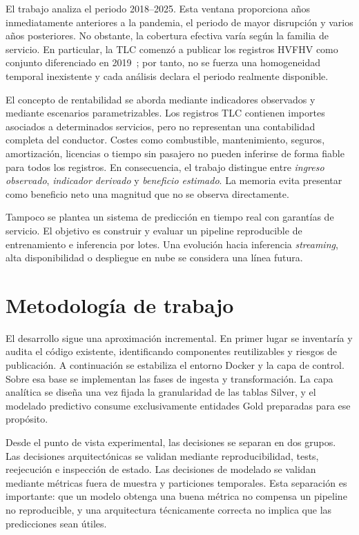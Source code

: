 El trabajo analiza el periodo 2018--2025. Esta ventana proporciona años inmediatamente anteriores a la pandemia, el periodo de mayor disrupción y varios años posteriores. No obstante, la cobertura efectiva varía según la familia de servicio. En particular, la TLC comenzó a publicar los registros HVFHV como conjunto diferenciado en 2019~\cite{nyctlc_tripdata}; por tanto, no se fuerza una homogeneidad temporal inexistente y cada análisis declara el periodo realmente disponible.

El concepto de rentabilidad se aborda mediante indicadores observados y mediante escenarios parametrizables. Los registros TLC contienen importes asociados a determinados servicios, pero no representan una contabilidad completa del conductor. Costes como combustible, mantenimiento, seguros, amortización, licencias o tiempo sin pasajero no pueden inferirse de forma fiable para todos los registros. En consecuencia, el trabajo distingue entre \textit{ingreso observado}, \textit{indicador derivado} y \textit{beneficio estimado}. La memoria evita presentar como beneficio neto una magnitud que no se observa directamente.

Tampoco se plantea un sistema de predicción en tiempo real con garantías de servicio. El objetivo es construir y evaluar un pipeline reproducible de entrenamiento e inferencia por lotes. Una evolución hacia inferencia \textit{streaming}, alta disponibilidad o despliegue en nube se considera una línea futura.

\section{Metodología de trabajo}

El desarrollo sigue una aproximación incremental. En primer lugar se inventaría y audita el código existente, identificando componentes reutilizables y riesgos de publicación. A continuación se estabiliza el entorno Docker y la capa de control. Sobre esa base se implementan las fases de ingesta y transformación. La capa analítica se diseña una vez fijada la granularidad de las tablas Silver, y el modelado predictivo consume exclusivamente entidades Gold preparadas para ese propósito.

Desde el punto de vista experimental, las decisiones se separan en dos grupos. Las decisiones arquitectónicas se validan mediante reproducibilidad, tests, reejecución e inspección de estado. Las decisiones de modelado se validan mediante métricas fuera de muestra y particiones temporales. Esta separación es importante: que un modelo obtenga una buena métrica no compensa un pipeline no reproducible, y una arquitectura técnicamente correcta no implica que las predicciones sean útiles.

